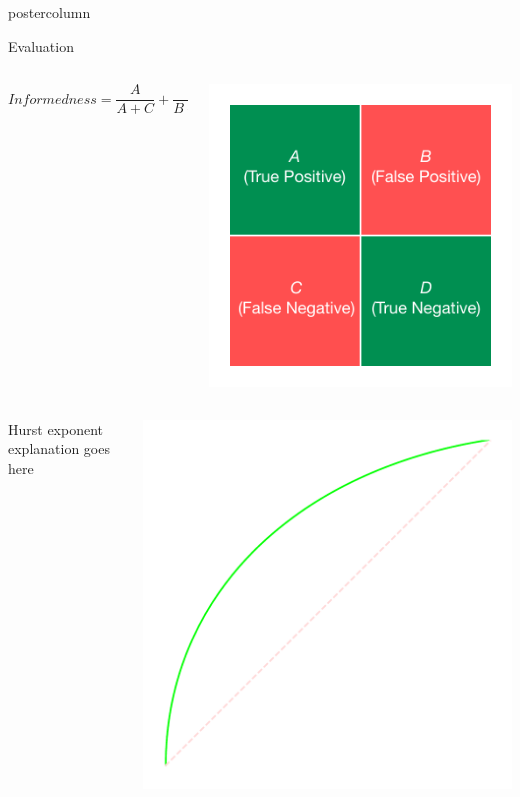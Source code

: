 \documentclass[final,hyperref={pdfpagelabels=false}]{beamer}
\begin{document}
\begin{frame}
\begin{columns}
\begin{column}{.49\textwidth}
\begin{beamercolorbox}[center,wd=\textwidth]{postercolumn}
\begin{minipage}[T]{.95\textwidth}
{\begin{block}{Evaluation}
\begin{itemize}
\begin{columns}
\begin{column}{.60\textwidth}
			       $$ Informedness = \frac{A}{A+C} + \frac{B}{B+D}$$
			       \end{column}
                		       \begin{column}{.38\textwidth}
		                         \includegraphics[width=0.65\linewidth]{figures/truth_table}
	       		       \end{column}
			       \end{columns}
			       \begin{columns}
			       \begin{column}{.60\textwidth}
			       Hurst exponent explanation goes here
			       \end{column}
			       \begin{column}{.38\textwidth}
			       	\includegraphics[width=0.65\linewidth]{figures/ROC}
			       \end{column}
			       \end{columns}
                \end{itemize}
            \end{block}
          }


\end{minipage}
\end{beamercolorbox}
\end{column}
\end{columns}
\end{frame}
\end{document}
